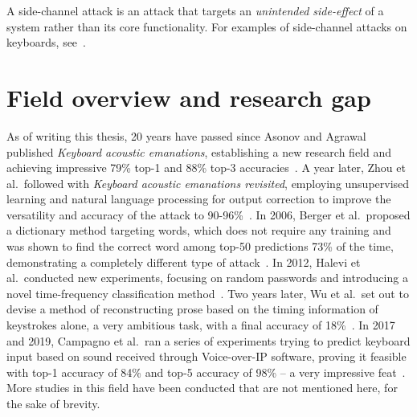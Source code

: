 \documentclass[../main.tex]{subfiles}
\begin{document}
A side-channel attack is an attack that targets an \emph{unintended side-effect} of a system rather than its core functionality. For examples of side-channel attacks on keyboards, see~\cite{Keylogging-Side-Channels}.

\section{Field overview and research gap}
\label{sec:intro_field_overview_research_gap}
As of writing this thesis, 20 years have passed since Asonov and Agrawal published \emph{Keyboard acoustic emanations}, establishing a new research field and achieving impressive 79\% top-1 and 88\% top-3 accuracies~\cite{og2004}.
A year later, Zhou et al.\ followed with \emph{Keyboard acoustic emanations revisited}, employing unsupervised learning and natural language processing for output correction to improve the versatility and accuracy of the attack to 90-96\%~\cite{revisited2005}.
In 2006, Berger et al.\ proposed a dictionary method targeting words, which does not require any training and was shown to find the correct word among top-50 predictions 73\% of the time, demonstrating a completely different type of attack~\cite{dict2006}.
In 2012, Halevi et al.\ conducted new experiments, focusing on random passwords and introducing a novel time-frequency classification method~\cite{acloserlook2012}.
Two years later, Wu et al.\ set out to devise a method of reconstructing prose based on the timing information
of keystrokes alone, a very ambitious task, with a final accuracy of 18\%~\cite{content_reconstruction_2014}.
In 2017 and 2019, Campagno et al.\ ran a series of experiments trying to predict keyboard input based on sound received through Voice-over-IP software, proving it feasible with top-1 accuracy of 84\% and
top-5 accuracy of 98\% -- a very impressive feat~\cite{skype2017, skype2019}.
More studies in this field have been conducted that are not mentioned here, for the sake of brevity.
\end{document}
